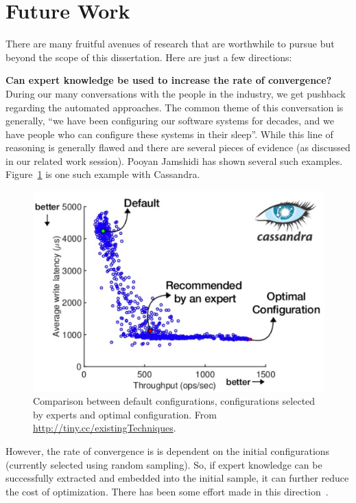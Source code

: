 \section{Future Work}
There are many fruitful avenues of research that are worthwhile to pursue but
beyond the scope of this dissertation. Here are just a few directions: 

\noindent\textbf{Can expert knowledge be used to increase the rate of convergence?}\\
During our many conversations with the people in the industry, we get pushback regarding the automated approaches. The common theme of this conversation is generally, ``we have been configuring our software systems for decades, and we have people who can configure these systems in their sleep''. While this line of reasoning is generally flawed and there are several pieces of evidence (as discussed in our related work session). Pooyan Jamshidi has shown several such examples. Figure~\ref{fig:expert_wrong} is one such example with Cassandra.
\begin{figure}[t]
\centering
\includegraphics[width=\columnwidth]{Chapter-Conclusion/Figures/ExpertWrong.png}
\caption[Comparison between default configurations,  configurations selected by experts and optimal configuration.]{Comparison between default configurations,  configurations selected by experts and optimal configuration. From \url{http://tiny.cc/existingTechniques}.
}
\label{fig:expert_wrong}
\end{figure}
However, the rate of convergence is \flash is dependent on the initial configurations (currently selected using random sampling). So, if expert knowledge can be successfully extracted and embedded into the initial sample, it can further reduce the cost of optimization. There has been some effort made in this direction~\cite{feurer2018scalable, Hsu2018Scout}.

